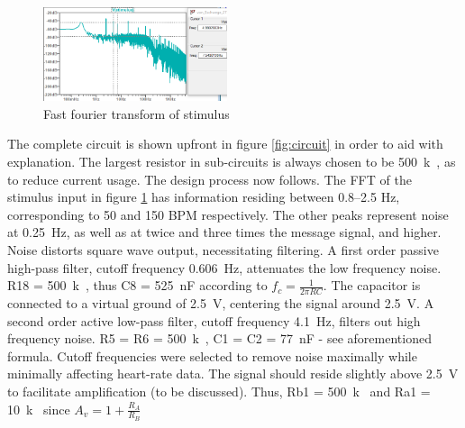 \begin{figure}
	\vspace{-0.4cm}
    \centering
    \includegraphics[width = 0.48\textwidth]{./Figures/fft}
    \caption{Fast fourier transform of stimulus}
    \label{fig:fft}
\end{figure}
The complete circuit is shown upfront in figure \ref{fig:circuit} in order to aid with explanation. The largest resistor in sub-circuits is always chosen to be \SI{500}{k\Omega}, as to reduce current usage. The design process now follows. The FFT of the stimulus input in figure \ref{fig:fft} has information residing between \numrange{0.8}{2.5} \si{Hz}, corresponding to 50 and 150 BPM respectively. The other peaks represent noise at \SI{0.25}{Hz}, as well as at twice and three times the message signal, and higher. Noise distorts square wave output, necessitating filtering. A first order passive high-pass filter, cutoff frequency \SI{0.606}{Hz}, attenuates the low frequency noise. R18 = \SI{500}{k\Omega}, thus C8 = \SI{525}{nF} according to $f_{c} = \frac{1}{2\pi R C}$. The capacitor is connected to a virtual ground of \SI{2.5}{V}, centering the signal around \SI{2.5}{V}. A second order active low-pass filter, cutoff frequency \SI{4.1}{Hz}, filters out high frequency noise. R5 = R6 = \SI{500}{k\Omega}, C1 = C2 = \SI{77}{nF} - see aforementioned formula. Cutoff frequencies were selected to remove noise maximally while minimally affecting heart-rate data. The signal should reside slightly above \SI{2.5}{V} to facilitate amplification (to be discussed). Thus, Rb1 = \SI{500}{k\Omega} and Ra1 = \SI{10}{k\Omega} since $A_v=1+\frac{R_{A}}{R_{B}}$ 
